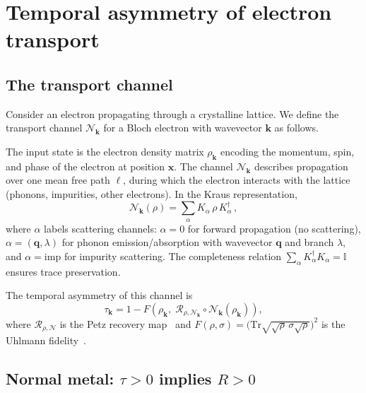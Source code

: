 \documentclass[prb,twocolumn,superscriptaddress,longbibliography,floatfix]{revtex4-2}
\newcommand{\Tr}{\mathrm{Tr}}
\newcommand{\Petz}{\mathcal{R}}
\newcommand{\chan}{\mathcal{N}}
\newcommand{\tauasym}{\tau}
\begin{document}
\section{Temporal asymmetry of electron transport}
\label{sec:tau_transport}

\subsection{The transport channel}

Consider an electron propagating through a crystalline lattice.
We define the transport channel $\chan_{\bm{k}}$ for a Bloch
electron with wavevector $\bm{k}$ as follows.

The input state is the electron density matrix $\rho_{\bm{k}}$
encoding the momentum, spin, and phase of the electron at position
$\bm{x}$.  The channel $\chan_{\bm{k}}$ describes propagation
over one mean free path $\ell$, during which the electron
interacts with the lattice (phonons, impurities, other electrons).
In the Kraus representation,
\begin{equation}\label{eq:transport_channel}
  \chan_{\bm{k}}(\rho) = \sum_{\alpha} K_\alpha\, \rho\, K_\alpha^\dagger\,,
\end{equation}
where $\alpha$ labels scattering channels: $\alpha = 0$ for
forward propagation (no scattering), $\alpha = (\bm{q}, \lambda)$
for phonon emission/absorption with wavevector $\bm{q}$ and
branch $\lambda$, and $\alpha = \mathrm{imp}$ for impurity
scattering.  The completeness relation
$\sum_\alpha K_\alpha^\dagger K_\alpha = \mathbb{I}$ ensures
trace preservation.

The temporal asymmetry of this channel is
\begin{equation}\label{eq:tau_transport}
  \tauasym_{\bm{k}} = 1 - F\!\left(\rho_{\bm{k}},\;
  \Petz_{\rho,\chan_{\bm{k}}} \circ \chan_{\bm{k}}(\rho_{\bm{k}})\right),
\end{equation}
where $\Petz_{\rho,\chan}$ is the Petz recovery
map~\cite{Petz1986,Petz1988} and $F(\rho,\sigma) =
\bigl(\Tr\sqrt{\sqrt{\rho}\,\sigma\sqrt{\rho}}\bigr)^2$ is the
Uhlmann fidelity~\cite{Uhlmann1976}.

\subsection{Normal metal: $\tauasym > 0$ implies $R > 0$}
\end{document}
